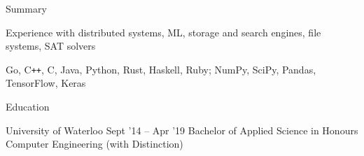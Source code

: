 \documentclass{resume} %
\begin{document}

\begin{rSection}{Summary}
  \begin{rSummarySection}
  {
    \item Experience with distributed systems, ML, storage and search engines,
      file systems, SAT solvers
    \item Go, C\texttt{++}, C, Java, Python, Rust, Haskell, Ruby; NumPy, SciPy,
      Pandas, TensorFlow, Keras
  }
  \end{rSummarySection}
\end{rSection}


\begin{rSection}{Education}
  \begin{rEducationSection}{University of Waterloo}
                           {Sept '14 -- Apr '19}
                           {Bachelor of Applied Science in Honours Computer Engineering (with Distinction)}
  \end{rEducationSection}
\end{rSection}

\end{document}
